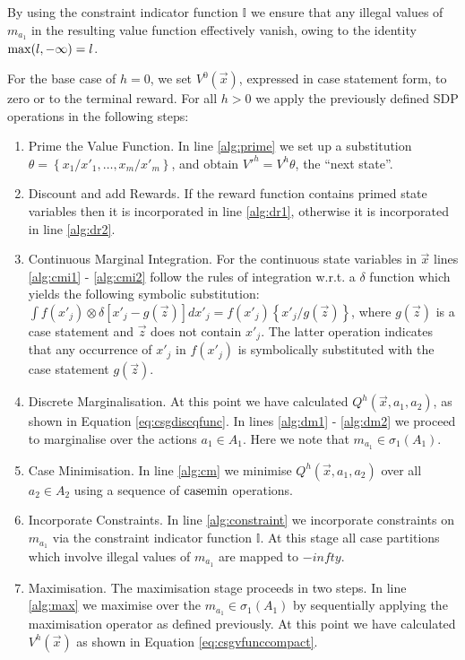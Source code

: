 By using the constraint indicator function $\mathbb{I}$
we ensure that any illegal values of $m_{a_{1}}$ in the resulting
value function effectively vanish, owing to the identity $\mathrm{max}(l, -\infty) = l$.

For the base case of $h = 0$, we set $V^0(\vec{x})$, expressed in 
case statement form, to zero or to the terminal reward. For all $h > 0$
we apply the previously defined SDP operations in the following steps:
\begin{enumerate}
  \item Prime the Value Function. In line \ref{alg:prime} we set up a 
            substitution $\theta = \left\{ x_1/x'_1, \ldots, x_m/x'_m \right\}$, 
            and obtain $V'^{h} = V^{h}\theta$, the ``next state''.
  \item Discount and add Rewards. If the reward function contains primed state variables
          then it is incorporated in line \ref{alg:dr1}, otherwise it is incorporated in line \ref{alg:dr2}.            
  \item Continuous Marginal Integration. For the continuous state variables in $\vec{x}$
            lines \ref{alg:cmi1} - \ref{alg:cmi2} follow the rules of integration w.r.t. a $\delta$ function 
            \cite{Sanner_UAI_2011} which yields the following symbolic
            substitution: 
            $\int f(x'_j) \otimes \delta\left[ x'_j - g(\vec{z})\right] dx'_j = f(x'_j)\left\{ x'_j/g(\vec{z})\right\}$,
            where $g(\vec{z})$ is a case statement and $\vec{z}$ does not contain $x'_j$.
            The latter operation indicates that any occurrence of $x'_j$ in $f(x'_j)$ is symbolically substituted
            with the case statement $g(\vec{z})$.
  \item Discrete Marginalisation. At this point we have calculated $Q^h(\vec{x}, a_1, a_2)$, as shown in
            Equation \eqref{eq:csgdiscqfunc}. In lines \ref{alg:dm1} - \ref{alg:dm2} we proceed to marginalise over the actions $a_1 \in A_1$.
            Here we note that $m_{a_{1}} \in \sigma_1(A_1)$.
  \item Case Minimisation. In line \ref{alg:cm} we minimise {\small $Q^h(\vec{x}, a_1, a_2)$ } over all $a_2 \in A_2$ using
            a sequence of $\mathrm{casemin}$ operations.
  \item Incorporate Constraints. In line \ref{alg:constraint} we incorporate constraints on $m_{a_{1}}$ 
            via the constraint indicator function $\mathbb{I}$. At this stage
            all case partitions which involve illegal values of $m_{a_{1}}$ are
            mapped to $-infty$.
  \item Maximisation. The maximisation stage proceeds in two steps.
            In line \ref{alg:max} we maximise over the $m_{a_{1}} \in \sigma_1(A_1)$ 
            by sequentially applying the maximisation operator as defined 
            previously. At this point we have calculated $V^{h}(\vec{x})$ as shown in 
          Equation \eqref{eq:csgvfunccompact}.
\end{enumerate}

